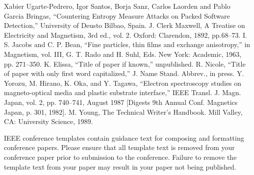\documentclass[conference]{IEEEtran}
\begin{document}
\begin{thebibliography}{00}
 Xabier Ugarte-Pedrero, Igor Santos, Borja Sanz, Carlos Laorden and Pablo Garcia Bringas, ``Countering Entropy Measure Attacks on Packed
Software Detection,'' University of Deusto
Bilbao, Spain.
 J. Clerk Maxwell, A Treatise on Electricity and Magnetism, 3rd ed., vol. 2. Oxford: Clarendon, 1892, pp.68--73.
 I. S. Jacobs and C. P. Bean, ``Fine particles, thin films and exchange anisotropy,'' in Magnetism, vol. III, G. T. Rado and H. Suhl, Eds. New York: Academic, 1963, pp. 271--350.
 K. Elissa, ``Title of paper if known,'' unpublished.
 R. Nicole, ``Title of paper with only first word capitalized,'' J. Name Stand. Abbrev., in press.
 Y. Yorozu, M. Hirano, K. Oka, and Y. Tagawa, ``Electron spectroscopy studies on magneto-optical media and plastic substrate interface,'' IEEE Transl. J. Magn. Japan, vol. 2, pp. 740--741, August 1987 [Digests 9th Annual Conf. Magnetics Japan, p. 301, 1982].
 M. Young, The Technical Writer's Handbook. Mill Valley, CA: University Science, 1989.
\end{thebibliography}
\vspace{12pt}
\color{red}
IEEE conference templates contain guidance text for composing and formatting conference papers. Please ensure that all template text is removed from your conference paper prior to submission to the conference. Failure to remove the template text from your paper may result in your paper not being published.
\end{document}
